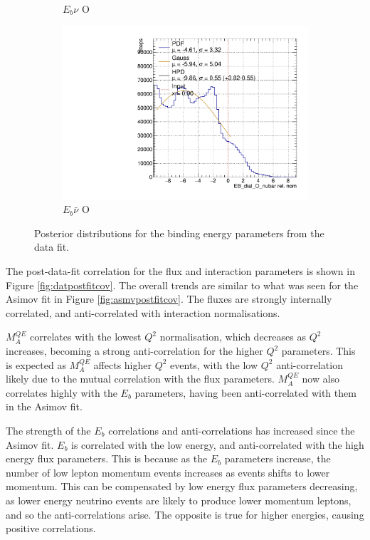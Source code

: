 \begin{figure}[!htbp]
\begin{subfigure}{.48\textwidth}
  \caption{$E_{b}\nu$ O}
\end{subfigure}
\begin{subfigure}{.48\textwidth}
  \centering
  \includegraphics[width=0.73\linewidth]{figs/EB_dial_O_nubarDataPoly}
  \caption{$E_{b}\bar{\nu}$ O}
\end{subfigure}
\caption{Posterior distributions for the binding energy parameters from the data fit.}
\label{fig:Ebdatares}
\end{figure}

The post-data-fit correlation for the flux and interaction parameters is shown in Figure \ref{fig:datpostfitcov}. The overall trends are similar to what was seen for the Asimov fit in Figure \ref{fig:asmvpostfitcov}. The fluxes are strongly internally correlated, and anti-correlated with interaction normalisations. 

$M^{QE}_A$ correlates with the lowest $Q^2$ normalisation, which decreases as $Q^2$ increases, becoming a strong anti-correlation for the higher $Q^2$ parameters. This is expected as $M^{QE}_A$ affects higher $Q^2$ events, with the low $Q^2$ anti-correlation likely due to the mutual correlation with the flux parameters. $M^{QE}_A$ now also correlates highly with the $E_b$ parameters, having been anti-correlated with them in the Asimov fit.

The strength of the $E_b$ correlations and anti-correlations has increased since the Asimov fit. $E_b$ is correlated with the low energy, and anti-correlated with the high energy flux parameters. This is because as the $E_b$ parameters increase, the number of low lepton momentum events increases as events shifts to lower momentum. This can be compensated by low energy flux parameters decreasing, as lower energy neutrino events are likely to produce lower momentum leptons, and so the anti-correlations arise. The opposite is true for higher energies, causing positive correlations.

